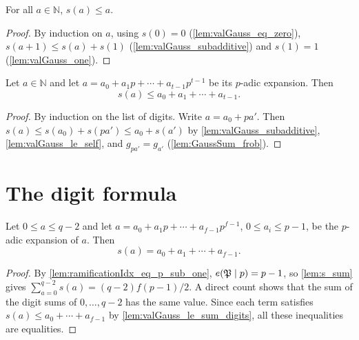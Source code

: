 \begin{lemma}
  \label{lem:valGauss_le_self}
  \leanok
  For all $a \in \mathbb{N}$, $s(a) \leq a$.
\end{lemma}

\begin{proof}
  \leanok
  By induction on $a$, using $s(0) = 0$ (\ref{lem:valGauss_eq_zero}),
  $s(a+1) \leq s(a) + s(1)$ (\ref{lem:valGauss_subadditive}) and $s(1) = 1$
  (\ref{lem:valGauss_one}).
\end{proof}

\begin{lemma}
  \label{lem:valGauss_le_sum_digits}
  \leanok
  Let $a \in \mathbb{N}$ and let
  $a = a_0 + a_1 p + \cdots + a_{t-1} p^{t-1}$ be its $p$-adic expansion.
  Then
  \[
    s(a) \leq a_0 + a_1 + \cdots + a_{t-1}.
  \]
\end{lemma}

\begin{proof}
  \leanok
  By induction on the list of digits. Write $a = a_0 + p a'$. Then
  $s(a) \leq s(a_0) + s(pa') \leq a_0 + s(a')$ by \ref{lem:valGauss_subadditive},
  \ref{lem:valGauss_le_self}, and $g_{pa'} = g_{a'}$ (\ref{lem:GaussSum_frob}).
\end{proof}

\section{The digit formula}

\begin{proposition}
  \label{prop:valGauss_eq_sum_digits}
  \leanok
  Let $0 \leq a \leq q - 2$ and let
  $a = a_0 + a_1 p + \cdots + a_{f-1} p^{f-1}$, $0 \leq a_i \leq p - 1$,
  be the $p$-adic expansion of $a$. Then
  \[
    s(a) = a_0 + a_1 + \cdots + a_{f-1}.
  \]
\end{proposition}

\begin{proof}
  \leanok
  By \ref{lem:ramificationIdx_eq_p_sub_one}, $e(\mathfrak{P} \mid p) = p - 1$, so
  \ref{lem:s_sum} gives $\sum_{a=0}^{q-2} s(a) = (q-2)f(p-1)/2$. A direct count shows that
  the sum of the digit sums of $0, \ldots, q-2$ has the same value. Since each term satisfies
  $s(a) \leq a_0 + \cdots + a_{f-1}$ by \ref{lem:valGauss_le_sum_digits}, all these
  inequalities are equalities.
\end{proof}

